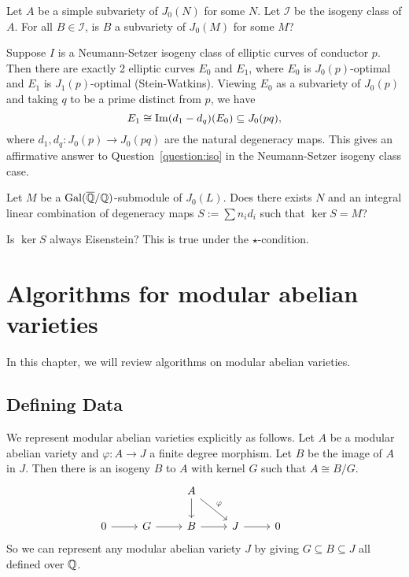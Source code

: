 \documentclass[11pt, proquest]{uwthesis}
\begin{document}
\begin{question}
    \label{question:iso}
    Let $A$ be a simple subvariety of $J_0(N)$ for some $N$. Let $\mathcal{I}$
    be the isogeny class of $A$. For all $B\in \mathcal{I}$, is $B$ a
    subvariety of $J_0(M)$ for some $M$?
\end{question}

\begin{example}
    Suppose $I$ is a Neumann-Setzer isogeny class of elliptic curves of
    conductor $p$. Then there are exactly 2 elliptic curves $E_0$ and $E_1$,
    where $E_0$ is $J_0(p)$-optimal and $E_1$ is $J_1(p)$-optimal
    (Stein-Watkins). Viewing $E_0$ as a subvariety of $J_0(p)$ and taking $q$
    to be a prime distinct from $p$, we have
    \[
        E_1 \cong \operatorname{Im} (d_1-d_q)(E_0)\subseteq J_0(pq),
    \]
    where $d_1, d_q:J_0(p)\to J_0(pq)$ are the natural degeneracy maps. This
    gives an affirmative answer to Question~\ref{question:iso} in the
    Neumann-Setzer isogeny class case.
\end{example}


\begin{question}
    Let $M$ be a $\operatorname{Gal}(\overline{\mathbb{Q}}/\mathbb{Q})$-submodule of $J_0(L)$. Does there exists
    $N$ and an integral linear combination of degeneracy maps $S:=\sum n_i d_i$
    such that $\ker S=M$?
\end{question}

\begin{question}
    Is $\ker S$ always Eisenstein? This is true under the $\star$-condition.
\end{question}

\chapter{Algorithms for modular abelian varieties}%
\label{chap:algorithms}


In this chapter, we will review algorithms on modular abelian varieties.

\section{Defining Data}

We represent modular abelian varieties explicitly as follows. Let $A$ be a
modular abelian variety and $\varphi:A\to J$ a finite degree morphism. Let
$B$ be the image of $A$ in $J$. Then there is an isogeny $B$ to $A$ with kernel
$G$ such that $A\cong B/G$.
\begin{equation}
    \label{eq:defining_data}
    \begin{tikzcd}
        &
        &
        A \arrow[d]\arrow[dr,"\varphi"] &
        &
        &
        \\
        0 \arrow[r] &
        G \arrow[r] &
        B \arrow[r] &
        J \arrow[r] &
        0
    \end{tikzcd}
\end{equation}
So we can represent any modular abelian variety $J$ by giving $G\subseteq
B\subseteq J$ all defined over $\mathbb{Q}$.
\end{document}
